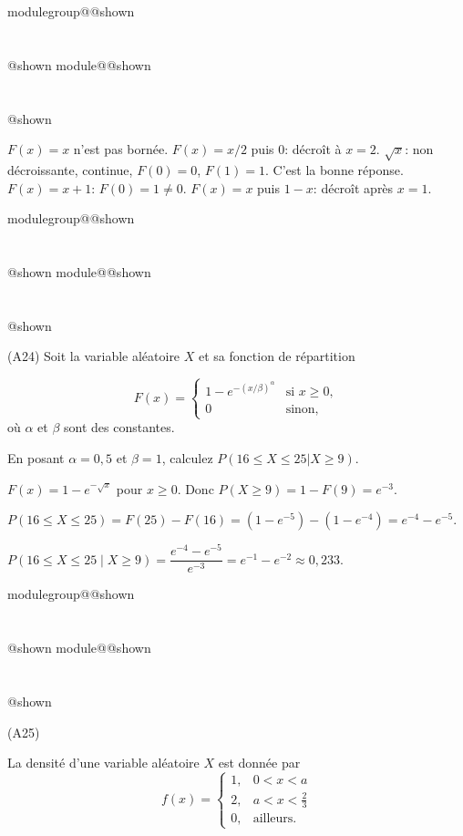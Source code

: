 \documentclass{Evaluation}
\makeatletter
\newcommand{\currentmodulekey}{}
\newcommand{\currentmoduletitle}{}
\newcommand{\currentgroupkey}{}
\newcommand{\currentgrouptitle}{}
\newcommand{\showmoduleifneeded}{%
  \ifx\currentgroupkey\empty\else
    \expandafter\ifx\csname modulegroup@\currentgroupkey @shown\endcsname\relax
      \section*{\currentgrouptitle}%
      \expandafter\gdef\csname modulegroup@\currentgroupkey @shown\endcsname{1}%
    \fi
  \fi
  \expandafter\ifx\csname module@\currentmodulekey @shown\endcsname\relax
    \section*{\currentmoduletitle}%
    \expandafter\gdef\csname module@\currentmodulekey @shown\endcsname{1}%
  \fi
}
\newenvironment{A24}{\showmoduleifneeded}{}
\newenvironment{A25}{\showmoduleifneeded}{}
\makeatother
\begin{document}
\begin{questions}
\begin{A24}
\begin{solution}
    $F(x)=x$ n'est pas bornée. $F(x)=x/2$ puis $0$: décroît à $x=2$. $\sqrt{x}$: non décroissante, continue, $F(0)=0$, $F(1)=1$. C'est la bonne réponse. $F(x)=x+1$: $F(0)=1\neq 0$. $F(x)=x$ puis $1-x$: décroît après $x=1$.
\end{solution}
\end{A24}

\begin{A24}
\question (A24) Soit la variable aléatoire $X$ et sa fonction de répartition

\[ F(x) =
\begin{cases}
   \displaystyle 1-e^{-(x/\beta)^\alpha}& \text{si } x \ge 0, \\
    0 & \text{sinon},
\end{cases}
\]
où $\alpha$ et $\beta$ sont des constantes.

En posant $\alpha = 0,5$ et $\beta=1$, calculez $P(16 \leq X \leq 25 | X\geq 9)$.

\begin{solution}
    $F(x)=1-e^{-\sqrt{x}}$ pour $x\geq 0$. Donc $P(X\geq 9)=1-F(9)=e^{-3}$.

    $P(16\leq X\leq 25)=F(25)-F(16)=(1-e^{-5})-(1-e^{-4})=e^{-4}-e^{-5}$.

    $P(16\leq X\leq 25\mid X\geq 9)=\dfrac{e^{-4}-e^{-5}}{e^{-3}}=e^{-1}-e^{-2}\approx 0,233$.
\end{solution}
\end{A24}

\begin{A25}
\question\label{2moyregle} (A25)

La densité d'une variable aléatoire $X$ est donnée par
$$f(x)=\left\{\begin{array}{ll}
1, & 0<x<a \\ 2, & a<x<\frac{2}{3} \\ 0, &  \text{ailleurs.}
\end{array}\right.$$

\end{A25}
\end{questions}
\end{document}
